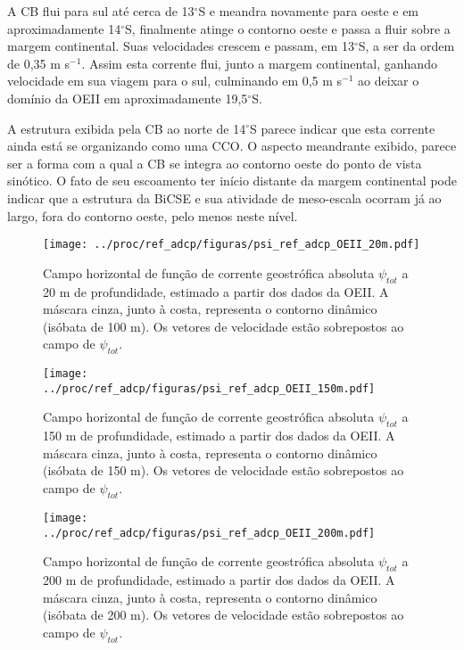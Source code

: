 A CB flui para sul até cerca de 13$^\circ$S e meandra novamente para oeste e em aproximadamente 14$^\circ$S, 
finalmente atinge o contorno oeste e 
passa a fluir sobre a margem continental. Suas velocidades crescem e passam, em 13$^\circ$S, a ser da ordem de 0,35 m s$^{-1}$.
Assim esta corrente flui, junto a margem continental, 
ganhando velocidade em sua viagem para o sul, culminando em 0,5 m s$^{-1}$ ao deixar o 
domínio da OEII em aproximadamente 19,5$^\circ$S. 

A estrutura exibida pela CB ao norte de 14$^\circ$S
parece indicar que esta corrente ainda está se organizando como uma CCO. O aspecto meandrante
exibido, parece ser a forma com a qual a CB se integra ao contorno oeste do ponto de vista 
sinótico. O fato de seu escoamento ter início distante da margem continental pode indicar que
a estrutura da BiCSE e sua atividade de meso-escala ocorram já ao largo, fora do contorno
oeste, pelo menos neste nível. 

\begin{figure}%
 \begin{center}
  \texttt{[image: ../proc/ref\_adcp/figuras/psi\_ref\_adcp\_OEII\_20m.pdf]}
 \end{center}
 \vspace{-.25cm}
 \renewcommand{\baselinestretch}{1}
 \caption{\label{fig:psi_oeii20} \small Campo horizontal de função de corrente geostrófica absoluta $\psi_{tot}$ a 20 m de profundidade, estimado a partir dos dados da OEII. 
 A máscara cinza, junto à costa, representa o contorno dinâmico (isóbata de 100 m). Os vetores de velocidade
 estão sobrepostos ao campo de $\psi_{tot}$.}
\end{figure}

\begin{figure}%
 \begin{center}
  \texttt{[image: ../proc/ref\_adcp/figuras/psi\_ref\_adcp\_OEII\_150m.pdf]}
 \end{center}
 \vspace{-.25cm}
 \renewcommand{\baselinestretch}{1}
 \caption{\label{fig:psi_oeii150} \small Campo horizontal de função de corrente geostrófica absoluta $\psi_{tot}$ a 150 m de profundidade, estimado a partir dos dados da OEII. 
 A máscara cinza, junto à costa, representa o contorno dinâmico (isóbata de 150 m). Os vetores de velocidade
 estão sobrepostos ao campo de $\psi_{tot}$.}
\end{figure}

\begin{figure}%
 \begin{center}
  \texttt{[image: ../proc/ref\_adcp/figuras/psi\_ref\_adcp\_OEII\_200m.pdf]}
 \end{center}
 \vspace{-.25cm}
 \renewcommand{\baselinestretch}{1}
 \caption{\label{fig:psi_oeii200} \small Campo horizontal de função de corrente geostrófica absoluta $\psi_{tot}$ a 200 m de profundidade, estimado a partir dos dados da OEII. 
 A máscara cinza, junto à costa, representa o contorno dinâmico (isóbata de 200 m). Os vetores de velocidade
 estão sobrepostos ao campo de $\psi_{tot}$.}
\end{figure}

